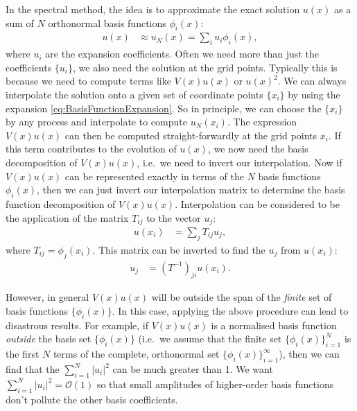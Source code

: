 \documentclass[aip,amsmath,amssymb,reprint,twocolumn]{revtex4-1}
\newcommand{\abs}[1]{\left|#1\right|}
\begin{document}
In the spectral method, the idea is to approximate the exact solution $u(x)$ as a sum of $N$ orthonormal basis functions $\phi_i(x)$:
\begin{align}
  u(x) &\approx u_N(x) = \sum_i u_i \phi_i(x), \label{eq:BasisFunctionExpansion}
\end{align}
where $u_i$ are the expansion coefficients.  Often we need more than just the coefficients $\{u_i\}$, we also need the solution at the grid points.  Typically this is because we need to compute terms like $V(x) u(x)$ or $u(x)^2$.  We can always interpolate the solution onto a given set of coordinate points $\{x_i\}$ by using the expansion \eqref{eq:BasisFunctionExpansion}.  So in principle, we can choose the $\{x_i\}$ by any process and interpolate to compute $u_N(x_i)$.  The expression $V(x) u(x)$ can then be computed straight-forwardly at the grid points $x_i$.  If this term contributes to the evolution of $u(x)$, we now need the basis decomposition of $V(x) u(x)$, i.e.\ we need to invert our interpolation.  Now if $V(x) u(x)$ can be represented exactly in terms of the $N$ basis functions $\phi_i(x)$, then we can just invert our interpolation matrix to determine the basis function decomposition of $V(x) u(x)$.  Interpolation can be considered to be the application of the matrix $T_{ij}$ to the vector $u_j$:
\begin{align}
  u(x_i) &= \sum_j T_{ij} u_j,
\end{align}
where $T_{ij} = \phi_j(x_i)$.  This matrix can be inverted to find the $u_j$ from $u(x_i)$:
\begin{align}
  u_j &= \left(T^{-1}\right)_{ji} u(x_i).
\end{align}

However, in general $V(x) u(x)$ will be outside the span of the \emph{finite} set of basis functions $\{\phi_i(x)\}$.  In this case, applying the above procedure can lead to disastrous results.  For example, if $V(x) u(x)$ is a normalised basis function \emph{outside} the basis set $\{\phi_i(x)\}$ (i.e.\ we assume that the finite set $\{\phi_i(x)\}_{i=1}^N$ is the first $N$ terms of the complete, orthonormal set $\{\phi_i(x)\}_{i=1}^\infty$), then we can find that the $\sum_{i=1}^N \abs{u_i}^2$ can be much greater than 1.  We want $\sum_{i=1}^N \abs{u_i}^2 = \mathcal{O}(1)$ so that small amplitudes of higher-order basis functions don't pollute the other basis coefficients.
\end{document}
